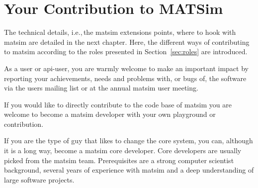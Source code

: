 \section{Your Contribution to MATSim}
\label{sec:yourcontribution}
The technical details, i.e.,\,the \gls{matsim} extensions points, where to hook with \gls{matsim} are detailed in the next chapter. Here, the different ways of contributing to \gls{matsim} according to the roles presented in Section~\ref{sec:roles} are introduced.

As a user or \gls{api}-user, you are warmly welcome to make an important impact by reporting your achievements, needs and problems with, or bugs of, the software via the users mailing list or at the annual \gls{matsim} user meeting. 

If you would like to directly contribute to the code base of \gls{matsim} you are welcome to become a \gls{matsim} developer with your own playground or \gls{contribution}.

If you are the type of guy that likes to change the core system, you can, although it is a long way, become a \gls{matsim} core developer. Core developers are usually picked from the \gls{matsim} team. Prerequisites are a strong computer scientist background, several years of experience with \gls{matsim} and a deep understanding of large software projects.

